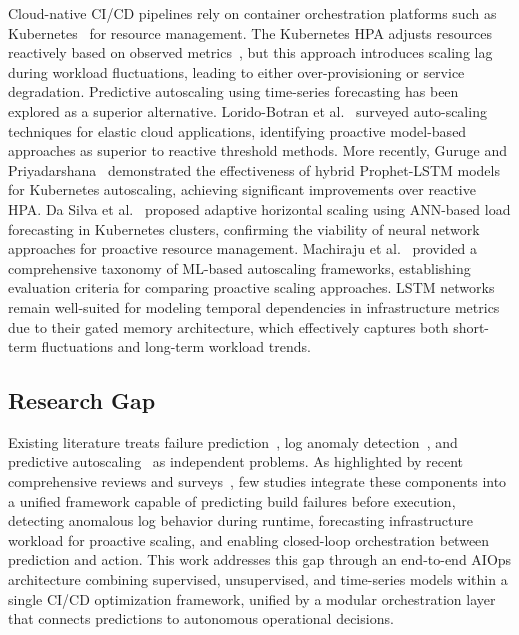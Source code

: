 \documentclass[sn-nature]{sn-jnl}
\theoremstyle{thmstyleone}
\theoremstyle{thmstyletwo}
\theoremstyle{thmstylethree}
\begin{document}
Cloud-native CI/CD pipelines rely on container orchestration platforms such as Kubernetes~\cite{burns2016borg} for resource management.
The Kubernetes HPA adjusts resources reactively based on observed metrics~\cite{kubernetesDocs}, but this approach introduces scaling lag during workload fluctuations, leading to either over-provisioning or service degradation.
Predictive autoscaling using time-series forecasting has been explored as a superior alternative.
Lorido-Botran et al.~\cite{lorido2014autoscaling} surveyed auto-scaling techniques for elastic cloud applications, identifying proactive model-based approaches as superior to reactive threshold methods.
More recently, Guruge and Priyadarshana~\cite{guruge2025prophet} demonstrated the effectiveness of hybrid Prophet-LSTM models for Kubernetes autoscaling, achieving significant improvements over reactive HPA.
Da Silva et al.~\cite{dasilva2025adaptive} proposed adaptive horizontal scaling using ANN-based load forecasting in Kubernetes clusters, confirming the viability of neural network approaches for proactive resource management.
Machiraju et al.~\cite{machiraju2026mlautoscaling} provided a comprehensive taxonomy of ML-based autoscaling frameworks, establishing evaluation criteria for comparing proactive scaling approaches.
LSTM networks~\cite{hochreiter1997lstm} remain well-suited for modeling temporal dependencies in infrastructure metrics due to their gated memory architecture, which effectively captures both short-term fluctuations and long-term workload trends.

\subsection{Research Gap}\label{subsec:gap}

Existing literature treats failure prediction~\cite{chen2016xgboost, rausch2017empirical}, log anomaly detection~\cite{du2017deeplog, le2022log, liao2025logtransformer}, and predictive autoscaling~\cite{lorido2014autoscaling, guruge2025prophet} as independent problems.
As highlighted by recent comprehensive reviews and surveys~\cite{zota2025agentic, bayram2025trustworthy, machiraju2026mlautoscaling}, few studies integrate these components into a unified framework capable of predicting build failures before execution, detecting anomalous log behavior during runtime, forecasting infrastructure workload for proactive scaling, and enabling closed-loop orchestration between prediction and action.
This work addresses this gap through an end-to-end AIOps architecture combining supervised, unsupervised, and time-series models within a single CI/CD optimization framework, unified by a modular orchestration layer that connects predictions to autonomous operational decisions.
\end{document}
